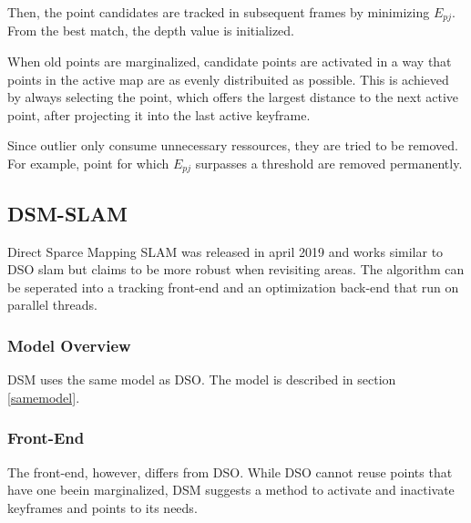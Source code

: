 \begin{enumerate}
	Then, the point candidates are tracked in subsequent frames by minimizing $E_{pj}$. From the best match, the depth value is initialized. 
	
	When old points are marginalized, candidate points are activated in a way that points in the active map are as evenly distribuited 
	as possible. This is achieved by always selecting the point, which offers the largest distance to the next active point, after projecting
	it into the last active keyframe. 
	
	Since outlier only consume unnecessary ressources, they are tried to be removed. For example, point for which $E_{pj}$ surpasses a threshold 
	are removed permanently. 
	
	\end{enumerate}

	\subsection{DSM-SLAM}
	
	Direct Sparce Mapping SLAM was released in april 2019 and works similar to DSO slam but claims to be more robust when revisiting 
	areas. The algorithm can be seperated into a tracking 
	front-end and an optimization back-end that run on parallel threads. 
	
	\subsubsection{Model Overview}
	
		DSM uses the same model as DSO. The model is described in section \ref{samemodel}.
	
	\subsubsection{Front-End}
	
	The front-end, however, differs from DSO. While DSO cannot reuse points that have one beein marginalized, DSM suggests a method 
	to activate and inactivate keyframes and points to its needs. 
	
